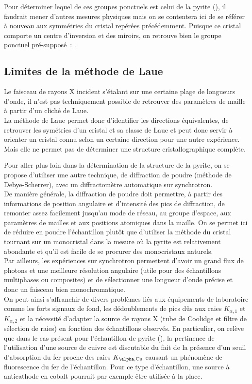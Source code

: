 Pour déterminer lequel de ces groupes ponctuels est celui de la pyrite (), il faudrait mener d'autres mesures physiques mais on se contentera ici de se référer à nouveau aux symmétries du cristal repérées précédemment.
Puisque ce cristal comporte un centre d'inversion et des miroirs, on retrouve bien le groupe ponctuel pré-supposé~: .

\subsection{Limites de la méthode de Laue}

Le faisceau de rayons X incident s'étalant sur une certaine plage de longueurs d'onde, il n'est pas techniquement possible de retrouver des paramètres de maille à partir d'un cliché de Laue.\\
La méthode de Laue permet donc d'identifier les directions équivalentes, de retrouver les symétries d'un cristal et sa classe de Laue et peut donc servir à orienter un cristal connu selon un certaine direction pour une autre expérience.
Mais elle ne permet pas de déterminer une structure cristallographique complète.

Pour aller plus loin dans la détermination de la structure de la pyrite, on se propose d'utiliser une autre technique, de diffraction de poudre (méthode de Debye-Scherrer), avec un diffractomètre automatique sur synchrotron.\\
De manière générale, la diffraction de poudre doit permettre, à partir des informations de position angulaire et d'intensité des pics de diffraction, de remonter assez facilement jusqu'au mode de réseau, au groupe d'espace, aux paramètres de mailles et aux positions atomiques dans la maille.
On se permet ici de réduire en poudre l'échantillon plutôt que d'utiliser la méthode du cristal tournant sur un monocristal dans la mesure où la pyrite est relativement abondante et qu'il est facile de se procurer des monocristaux naturels.\\
Par ailleurs, les expériences sur synchrotron permettent d'avoir un grand flux de photons et une meilleure résolution angulaire (utile pour des échantillons multiphases ou composites) et de sélectionner une longueur d'onde précise et donc un faisceau bien monochromatique.\\
On peut ainsi s'affranchir de divers problèmes liés aux équipements de laboratoire comme les forts signaux de fond, les dédoublements de pics dûs aux raies \(K_{\alpha,1}\) et \(K_{\alpha,2}\) et la nécessité d'adapter la source de rayons X (tube de Coolidge et filtre de sélection de raies) en fonction des échantillons observés.
En particulier, on relève que dans le cas présent pour l'échantillon de pyrite (), la pertinence de l'utilisation d'une source de cuivre  est discutable du fait de la présence d'un seuil d'absorption du fer proche des raies \(K_{\alpha,\ce{Cu}}\) causant un phénomène de fluorescence du fer de l'échantillon.
Pour ce type d'échantillon, une source à anticathode en cobalt  pourrait par exemple être utilisée à la place.

